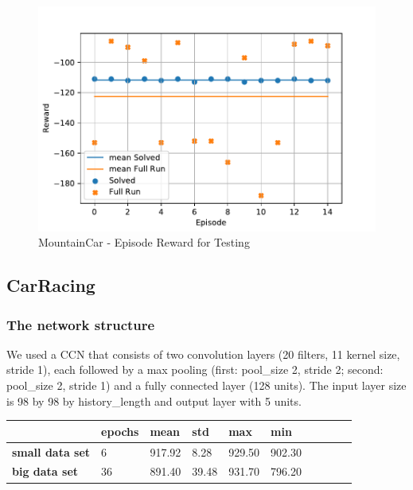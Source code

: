\documentclass[
        a4paper,
        10pt,
        parskip = full,    %
    ]{scrartcl}
\begin{document}
\begin{figure}[H]
  \begin{center}
    \includegraphics{./images/MountainCar-v0/tb_test_reward.pdf}
    \caption{MountainCar - Episode Reward for Testing}
    \label{MountainCarTestReward}
  \end{center}
\end{figure}






\subsection{CarRacing}

\subsubsection{The network structure}
We used a CCN that consists of two convolution layers (20 filters, 11 kernel size, stride 1), each followed by a max
pooling (first: pool_size 2, stride 2; second: pool_size 2, stride 1) and a fully connected
layer (128 units). The input layer size is 98 by 98 by history_length and output layer with 5 units.


\begin{center}
    \begin{tabular}{ | l | l | l |l| l| l| l| l| l| l|}
    \hline
                            & \textbf{epochs} & \textbf{mean} & \textbf{std} & \textbf{max} & \textbf{min}  \\ \hline
    \textbf{small data set} & 6   & 917.92      & 8.28      &   929.50    & 902.30  \\ \hline
    \textbf{big data set}  & 36 & 891.40 & 39.48 & 931.70  & 796.20  \\ \hline
    \end{tabular}
\end{center}
\end{document}
